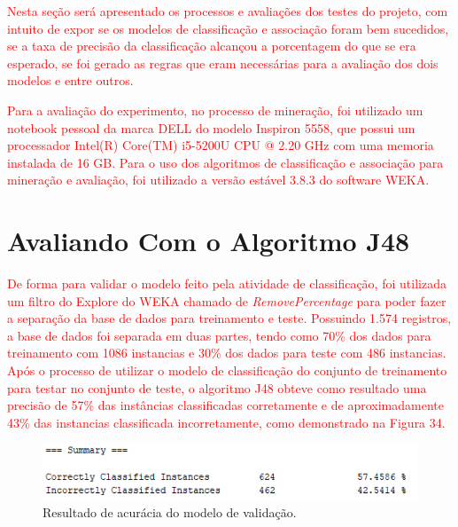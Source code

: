 \label{chapter:Avaliacao}

\par
\textcolor{red}{Nesta seção será apresentado os processos e avaliações dos testes do projeto, com intuito de expor se os modelos de classificação e associação foram bem sucedidos, se a taxa de precisão da classificação alcançou a porcentagem do que se era esperado, se foi gerado as regras que eram necessárias para a avaliação dos dois modelos e entre outros.}

\par
\textcolor{red}{Para a avaliação do experimento, no processo de mineração, foi utilizado um notebook pessoal da marca DELL do modelo Inspiron 5558, que possui um processador Intel(R) Core(TM) i5-5200U CPU @ 2.20 GHz com uma memoria instalada de 16 GB. Para o uso dos algoritmos de classificação e associação para mineração e avaliação, foi utilizado a versão estável 3.8.3 do software WEKA.}

\section{Avaliando Com o Algoritmo J48}

\par
\textcolor{red}{De forma para validar o modelo feito pela atividade de classificação, foi utilizada um filtro do Explore do WEKA chamado de \textit{RemovePercentage} para poder fazer a separação da base de dados para treinamento e teste. Possuindo 1.574 registros, a base de dados foi separada em duas partes, tendo como 70\% dos dados para treinamento com 1086 instancias e 30\% dos dados para teste com 486 instancias. Após o processo de utilizar o modelo de classificação do conjunto de treinamento para testar no conjunto de teste, o algoritmo J48 obteve como resultado uma precisão de 57\% das instâncias classificadas corretamente e de aproximadamente 43\% das instancias classificada incorretamente, como demonstrado na Figura 34.}

\par
\begin{figure}[!htp]
	\begin{center}
    \caption{\label{fig:waveform_fig} Resultado de acurácia do modelo de validação.}
	\includegraphics[scale=0.99]{Figuras/Modelo_de_validacao.png}
	\end{center}
\end{figure}

